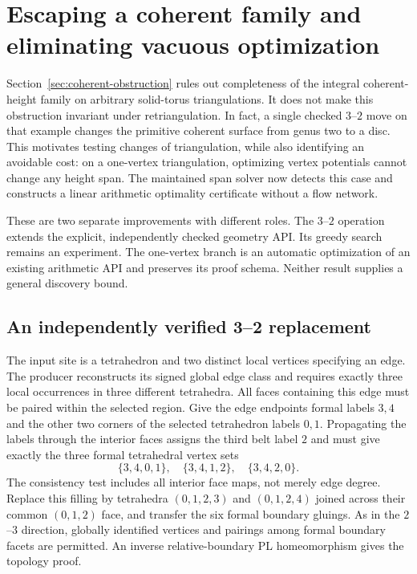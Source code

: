 \section{Escaping a coherent family and eliminating vacuous optimization}
\label{sec:coherent-escape}

Section~\ref{sec:coherent-obstruction} rules out completeness of the integral
coherent-height family on arbitrary solid-torus triangulations. It does not
make this obstruction invariant under retriangulation. In fact, a single
checked $3$--$2$ move on that example changes the primitive coherent surface
from genus two to a disc. This motivates testing changes of triangulation,
while also identifying an avoidable cost: on a one-vertex triangulation,
optimizing vertex potentials cannot change any height span. The maintained
span solver now detects this case and constructs a linear arithmetic
optimality certificate without a flow network.

These are two separate improvements with different roles. The $3$--$2$
operation extends the explicit, independently checked geometry API. Its
greedy search remains an experiment. The one-vertex branch is an automatic
optimization of an existing arithmetic API and preserves its proof schema.
Neither result supplies a general discovery bound.

\subsection{An independently verified 3--2 replacement}

The input site is a tetrahedron and two distinct local vertices specifying
an edge. The producer reconstructs its signed global edge class and requires
exactly three local occurrences in three different tetrahedra. All faces
containing this edge must be paired within the selected region. Give the
edge endpoints formal labels $3,4$ and the other two corners of the selected
tetrahedron labels $0,1$. Propagating the labels through the interior faces
assigns the third belt label $2$ and must give exactly the three formal
tetrahedral vertex sets
\[
 \{3,4,0,1\},\quad \{3,4,1,2\},\quad \{3,4,2,0\}.
\]
The consistency test includes all interior face maps, not merely edge degree.
Replace this filling by tetrahedra $(0,1,2,3)$ and $(0,1,2,4)$ joined across
their common $(0,1,2)$ face, and transfer the six formal boundary gluings.
As in the $2$--$3$ direction, globally identified vertices and pairings among
formal boundary facets are permitted. An inverse relative-boundary PL
homeomorphism gives the topology proof.

